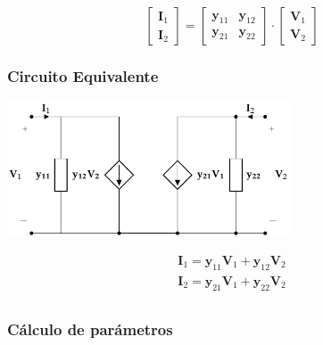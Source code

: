 \[
  \left[
    \begin{array}{c}
      \mathbf{I}_1\\
      \mathbf{I}_2
    \end{array}
  \right] =
  \left[
    \begin{array}{cc}
      \mathbf{y}_{11} & \mathbf{y}_{12}\\
      \mathbf{y}_{21} & \mathbf{y}_{22}
    \end{array}
  \right] \cdot
  \left[
    \begin{array}{c}
      \mathbf{V}_1\\
      \mathbf{V}_2
    \end{array}
  \right]
\]

\subsubsection{Circuito Equivalente}
\label{sec:orgc722f4f}
\begin{center}
\includegraphics[height=4cm]{../figs/circuitoEquivalenteY.pdf}
\end{center}

\[
\begin{array}{l}
  \mathbf{I}_1 = \mathbf{y}_{11} \mathbf{V}_1 + \mathbf{y}_{12} \mathbf{V}_2\\
  \mathbf{I}_2 = \mathbf{y}_{21} \mathbf{V}_1 + \mathbf{y}_{22} \mathbf{V}_2\\
\end{array}
\]


\subsubsection{Cálculo de parámetros}
\label{sec:org003b72b}

